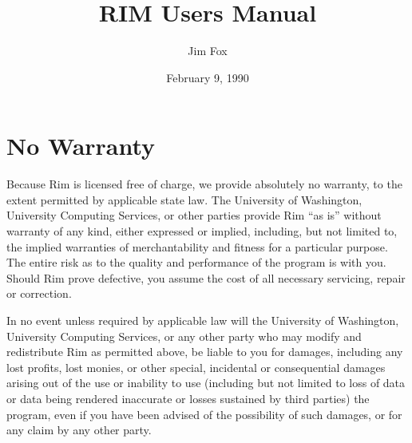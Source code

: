 \documentclass[11pt,a4paper]{report}
\begin{document}
%
\author{Jim Fox}
\title {RIM Users Manual}
\date   {February 9, 1990}

\def\UCScopytext{%
  Permission is granted to make and distribute verbatim copies of
  this manual provided the copyright notice and this permission notice
  are preserved on all copies.
  \par
  Permission is granted to copy and distribute modified versions of this
  manual under the conditions for verbatim copying, provided also that the
  sections entitled ``Distribution'' and
  ``Rim General Public License'' are included exactly as in the original, and
  provided that the entire resulting derived work is distributed under the
  terms of a permission notice identical to this one.
  \par}
\maketitle
%
%
\tableofcontents
\listoffigures


%
%
\chapter*{No Warranty}
%
{\parindent0pt\parskip1pc
  Because Rim is licensed free of charge, we provide absolutely
  no warranty, to the extent permitted by applicable state law.
  The University of Washington, University Computing Services,
  or other parties provide Rim ``as is''
  without warranty of any kind, either expressed or implied, including,
  but not limited to, the implied warranties of merchantability and
  fitness for a particular purpose.  The entire risk as to the quality
  and performance of the program is with you.  Should Rim
  prove defective, you assume the cost of all necessary
  servicing, repair or correction.
 
  In no event unless required by applicable law will
  the University of Washington, University Computing Services,
  or any other party who may
  modify and redistribute Rim as permitted above, be liable to you
  for damages, including any lost profits, lost monies, or other
  special, incidental or consequential damages arising out of the use or
  inability to use (including but not limited to loss of data or data
  being rendered inaccurate or losses sustained by third parties)
  the program, even if you have been
  advised of the possibility of such damages, or for any claim by any
  other party.
}
%
%
\end{document}
